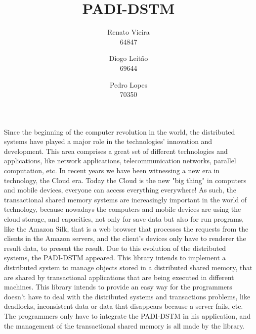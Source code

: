 \documentclass[times, 10pt,twocolumn]{article}
\begin{document}
\title{PADI-DSTM}

\author{Renato Vieira\\
64847
\and
Diogo Leit\~ao\\
69644
\and
Pedro Lopes\\
70350
}



\maketitle
\thispagestyle{empty}


Since the beginning of the computer revolution in the world, the distributed systems have played a major role in the technologies' innovation and development. This area comprises a great set of different technologies and applications, like network applications, telecommunication networks, parallel computation, etc. In recent years we have been witnessing a new era in technology, the Cloud era. Today the Cloud is the new "big thing" in computers and mobile devices, everyone can access everything  everywhere! As such, the transactional shared memory systems are increasingly important in the world of technology, because nowadays the computers and mobile devices are using the cloud storage, and capacities, not only for save data but also for run programs, like the Amazon Silk, that is a web browser that processes the requests from the clients in the Amazon servers, and the client's devices only have to renderer the result data, to present the result. Due to this evolution of the distributed systems, the PADI-DSTM appeared. This library intends to implement a distributed system to manage objects stored in a distributed shared memory, that are shared by transactional applications that are being executed in different machines. This library intends to provide an easy way for the programmers doesn't have to deal with the distributed systems and transactions problems, like deadlocks, inconsistent data or data that disappears because a server fails, etc. The programmers only have to integrate the PADI-DSTM in his application, and the management of the transactional shared memory is all made by the library.

\end{document}
